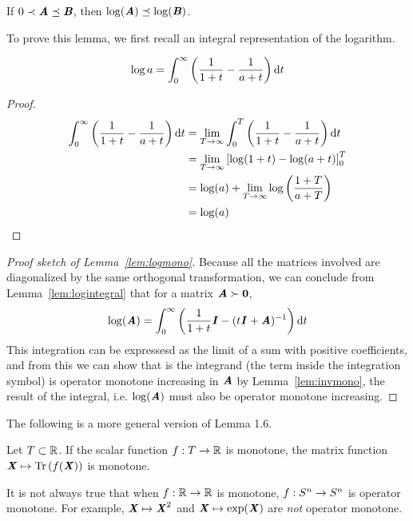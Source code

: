 \begin{lemma}\label{lem:logmono}
  If $0\prec\AA\preceq\BB$, then $\log(\AA)\preceq\log(\BB)$.
\end{lemma}
To prove this lemma, we first recall an integral representation of the
logarithm.
\begin{lemma}
  \label{lem:logintegral}
\[
\log a = \int_0^{\infty} \left(\frac{1}{1+t} -\frac{1}{a+t}  \right)
\diff t
    \]
\end{lemma}
\begin{proof}
  \begin{align*}
\int_0^{\infty} \left(\frac{1}{1+t} -\frac{1}{a+t}  \right) \diff t
    &=
    \lim_{T \to \infty}
      \int_0^{T} \left(\frac{1}{1+t} -\frac{1}{a+t}  \right) \diff t
\\
    &=
    \lim_{T \to \infty}
      \left[ \log(1+t) - \log(a+t) \right]_0^{T}
\\
    &=
      \log(a)
      +
    \lim_{T \to \infty}
      \log\left( \frac{1+T}{a+T} \right)
\\
    &=
      \log(a)
  \end{align*}
\end{proof}
\begin{proof}[Proof sketch of Lemma~\ref{lem:logmono}]
Because all the matrices involved are diagonalized by the same
orthogonal transformation, we can conclude from
Lemma~\ref{lem:logintegral} that for a matrix $\AA \succ \matzero$,
\[
 \log(\AA)
   = \int_0^{\infty} \left(\frac{1}{1+t}\II -(t \II + \AA)^{-1} \right) \diff t
\]
This integration can be expressesd as the limit of a sum with positive
coefficients, and from this we
can show that is the integrand (the term inside the integration
symbol) is operator monotone increasing in $\AA$ by
Lemma~\ref{lem:invmono}, the result of the integral, i.e. $\log(\AA)$
must also be operator monotone increasing.
\end{proof}

The following is a more general version of Lemma 1.6.
\begin{lemma}
  Let $T \subset \R$.
  If the scalar function $f : T \to \R$ is monotone, the matrix
  function $\XX \mapsto \trace{f(\XX)}$ is monotone.
\end{lemma}

\begin{remark}
  It is not always true that when $f: \R \to \R$ is monotone, $f:
  \symsetn \to \symsetn$ is operator monotone.
  For example, $\XX \mapsto \XX^2$ and $\XX \mapsto \exp(\XX)$ are \emph{not}
  operator monotone.
\end{remark}

